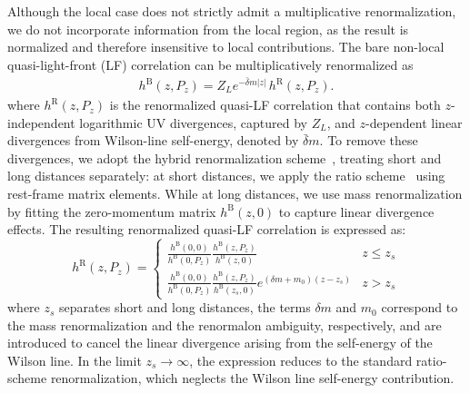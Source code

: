 Although the local case does not strictly admit a multiplicative renormalization, we do not incorporate information from the local region, as the result is normalized and therefore insensitive to local contributions. The bare non-local quasi-light-front (LF) correlation can be multiplicatively renormalized as~\cite{Zhang:2018diq}
%
\begin{align}
h^{\text{B}}(z,P_z)=Z_L e^{-\bar{\delta} m |z|} \,h^{\text{R}}(z,P_z).
\end{align}
where $h^{\text{R}}(z,P_z)$ is the renormalized quasi-LF correlation that contains both $z$-independent logarithmic UV divergences, captured by $Z_L$, and $z$-dependent linear divergences from Wilson-line self-energy, denoted by $\bar{\delta} m$.
To remove these divergences, we adopt the hybrid renormalization scheme~\cite{Ji:2020brr}, treating short and long distances separately:
at short distances, we apply the ratio scheme~\cite{Radyushkin:2018cvn} using rest-frame matrix elements.
While at long distances, we use mass renormalization by fitting the zero-momentum matrix $h^{\text{B}}(z,0)$ to capture linear divergence effects.
The resulting renormalized quasi-LF correlation is expressed as:
\begin{equation}\label{eq:hybridscheme}
h^{\mathrm{R}}(z, P_z) =
\begin{cases}
\!\displaystyle\!
\frac{h^{\mathrm{B}}(0,0)}{h^{\mathrm{B}}(0,P_z)} \frac{h^{\mathrm{B}}(z,P_z)}{h^{\mathrm{B}}(z,0)} & z \leq z_s \\[12pt]
\!\displaystyle\!
\frac{h^{\mathrm{B}}(0,0)}{h^{\mathrm{B}}(0,P_z)}  \frac{h^{\mathrm{B}}(z,P_z)}{h^{\mathrm{B}}(z_s,0)} e^{(\delta m + m_0)(z - z_s)} & z > z_s
\end{cases}
\end{equation}
where $z_s$ separates short and long distances, the terms $\delta m$ and $m_0$ correspond to the mass renormalization and the renormalon ambiguity, respectively, and are introduced to cancel the linear divergence arising from the self-energy of the Wilson line. In the limit $z_s \to \infty$, the expression reduces to the standard ratio-scheme renormalization, which neglects the Wilson line self-energy contribution.

